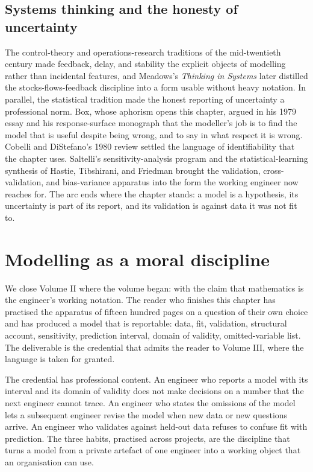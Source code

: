 \subsection{Systems thinking and the honesty of uncertainty}

The control-theory and operations-research traditions of the
mid-twentieth century made feedback, delay, and stability the explicit
objects of modelling rather than incidental features, and Meadows's
\emph{Thinking in Systems} \cite{gen:meadows2008} later distilled the
stocks-flows-feedback discipline into a form usable without heavy
notation. In parallel, the statistical tradition made the honest
reporting of uncertainty a professional norm. Box, whose aphorism opens
this chapter, argued in his 1979 essay
\cite{paper:v6c08-box-1979} and his response-surface monograph
\cite{text:v2ch18-box-empirical-1987} that the modeller's job is to
find the model that is useful despite being wrong, and to say in what
respect it is wrong. Cobelli and DiStefano's 1980 review
\cite{paper:v2ch18-cobelli-distefano-1980} settled the language of
identifiability that the chapter uses. Saltelli's sensitivity-analysis
program \cite{text:v2ch18-saltelli-sensitivity-2008} and the
statistical-learning synthesis of Hastie, Tibshirani, and Friedman
\cite{text:v2ch18-hastie-statistical-learning-2009} brought the
validation, cross-validation, and bias-variance apparatus into the form
the working engineer now reaches for. The arc ends where the chapter
stands: a model is a hypothesis, its uncertainty is part of its report,
and its validation is against data it was not fit to.

\section{Modelling as a moral discipline}

We close Volume II where the volume began: with the claim that
mathematics is the engineer's working notation. The reader who
finishes this chapter has practised the apparatus of fifteen
hundred pages on a question of their own choice and has produced
a model that is reportable: data, fit, validation, structural
account, sensitivity, prediction interval, domain of validity,
omitted-variable list. The deliverable is the credential that
admits the reader to Volume III, where the language is taken for
granted.

The credential has professional content. An engineer who reports
a model with its interval and its domain of validity does not
make decisions on a number that the next engineer cannot trace.
An engineer who states the omissions of the model lets a
subsequent engineer revise the model when new data or new
questions arrive. An engineer who validates against held-out
data refuses to confuse fit with prediction. The three habits,
practised across projects, are the discipline that turns a model
from a private artefact of one engineer into a working object
that an organisation can use.

